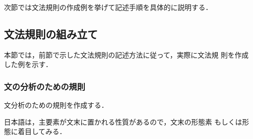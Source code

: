 次節では文法規則の作成例を挙げて記述手順を具体的に説明する．


\bfg
\vspace{0.3mm}
\vspace{0.7mm}
\vspace{1mm}

\subsection{文法規則の組み立て}
\label{文法規則の組み立て}

本節では，前節で示した文法規則の記述方法に従って，実際に文法規
則を作成した例を示す．

\vspace*{-4mm}

\subsubsection{文の分析のための規則}

\vspace*{-1mm}

{\dg 文}分析のための規則を作成する．

日本語は，主要素が文末に置かれる性質があるので，文末の形態素
もしくは形態に着目してみる．

